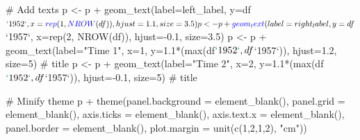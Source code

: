 \documentclass[a4paper]{article}
\newenvironment{Shaded}{}{}
\newcommand{\KeywordTok}[1]{\textcolor[rgb]{0.00,0.00,1.00}{#1}}
\newcommand{\DataTypeTok}[1]{#1}
\newcommand{\DecValTok}[1]{#1}
\newcommand{\FloatTok}[1]{#1}
\newcommand{\StringTok}[1]{\textcolor[rgb]{0.00,0.50,0.50}{#1}}
\newcommand{\CommentTok}[1]{\textcolor[rgb]{0.00,0.50,0.00}{#1}}
\newcommand{\OperatorTok}[1]{#1}
\newcommand{\NormalTok}[1]{#1}
\begin{document}
\begin{Shaded}
\begin{Highlighting}[]
\CommentTok{# Add texts}
\NormalTok{p <-}\StringTok{ }\NormalTok{p }\OperatorTok{+}\StringTok{ }
\StringTok{  }\KeywordTok{geom_text}\NormalTok{(}\DataTypeTok{label=}\NormalTok{left_label, }\DataTypeTok{y=}\NormalTok{df}\OperatorTok{$}\StringTok{`}\DataTypeTok{1952}\StringTok{`}\NormalTok{, }\DataTypeTok{x=}\KeywordTok{rep}\NormalTok{(}\DecValTok{1}\NormalTok{, }\KeywordTok{NROW}\NormalTok{(df)), }\DataTypeTok{hjust=}\FloatTok{1.1}\NormalTok{, }\DataTypeTok{size=}\FloatTok{3.5}\NormalTok{)}
\NormalTok{p <-}\StringTok{ }\NormalTok{p }\OperatorTok{+}\StringTok{ }
\StringTok{  }\KeywordTok{geom_text}\NormalTok{(}\DataTypeTok{label=}\NormalTok{right_label, }\DataTypeTok{y=}\NormalTok{df}\OperatorTok{$}\StringTok{`}\DataTypeTok{1957}\StringTok{`}\NormalTok{, }\DataTypeTok{x=}\KeywordTok{rep}\NormalTok{(}\DecValTok{2}\NormalTok{, }\KeywordTok{NROW}\NormalTok{(df)), }\DataTypeTok{hjust=}\OperatorTok{-}\FloatTok{0.1}\NormalTok{, }\DataTypeTok{size=}\FloatTok{3.5}\NormalTok{)}
\NormalTok{p <-}\StringTok{ }\NormalTok{p }\OperatorTok{+}\StringTok{ }
\StringTok{  }\KeywordTok{geom_text}\NormalTok{(}\DataTypeTok{label=}\StringTok{"Time 1"}\NormalTok{, }\DataTypeTok{x=}\DecValTok{1}\NormalTok{, }\DataTypeTok{y=}\FloatTok{1.1}\OperatorTok{*}\NormalTok{(}\KeywordTok{max}\NormalTok{(df}\OperatorTok{$}\StringTok{`}\DataTypeTok{1952}\StringTok{`}\NormalTok{, df}\OperatorTok{$}\StringTok{`}\DataTypeTok{1957}\StringTok{`}\NormalTok{)), }\DataTypeTok{hjust=}\FloatTok{1.2}\NormalTok{, }\DataTypeTok{size=}\DecValTok{5}\NormalTok{)  }\CommentTok{# title}
\NormalTok{p <-}\StringTok{ }\NormalTok{p }\OperatorTok{+}\StringTok{ }
\StringTok{  }\KeywordTok{geom_text}\NormalTok{(}\DataTypeTok{label=}\StringTok{"Time 2"}\NormalTok{, }\DataTypeTok{x=}\DecValTok{2}\NormalTok{, }\DataTypeTok{y=}\FloatTok{1.1}\OperatorTok{*}\NormalTok{(}\KeywordTok{max}\NormalTok{(df}\OperatorTok{$}\StringTok{`}\DataTypeTok{1952}\StringTok{`}\NormalTok{, df}\OperatorTok{$}\StringTok{`}\DataTypeTok{1957}\StringTok{`}\NormalTok{)), }\DataTypeTok{hjust=}\OperatorTok{-}\FloatTok{0.1}\NormalTok{, }\DataTypeTok{size=}\DecValTok{5}\NormalTok{)  }\CommentTok{# title}

\CommentTok{# Minify theme}
\NormalTok{p }\OperatorTok{+}\StringTok{ }\KeywordTok{theme}\NormalTok{(}\DataTypeTok{panel.background =} \KeywordTok{element_blank}\NormalTok{(), }
           \DataTypeTok{panel.grid =} \KeywordTok{element_blank}\NormalTok{(),}
           \DataTypeTok{axis.ticks =} \KeywordTok{element_blank}\NormalTok{(),}
           \DataTypeTok{axis.text.x =} \KeywordTok{element_blank}\NormalTok{(),}
           \DataTypeTok{panel.border =} \KeywordTok{element_blank}\NormalTok{(),}
           \DataTypeTok{plot.margin =} \KeywordTok{unit}\NormalTok{(}\KeywordTok{c}\NormalTok{(}\DecValTok{1}\NormalTok{,}\DecValTok{2}\NormalTok{,}\DecValTok{1}\NormalTok{,}\DecValTok{2}\NormalTok{), }\StringTok{"cm"}\NormalTok{))}
\end{Highlighting}
\end{Shaded}
\end{document}
